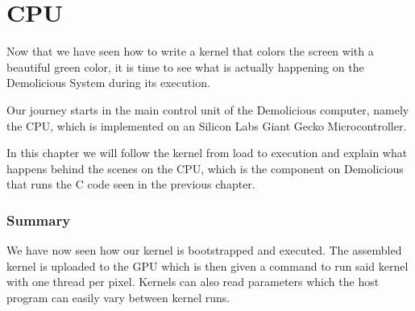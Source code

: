 \documentclass[../main/report.tex]{subfiles}
\begin{document}
\chapter{CPU}

Now that we have seen how to write a kernel that colors the screen with a beautiful green color,
it is time to see what is actually happening on the Demolicious System during its execution.

Our journey starts in the main control unit of the Demolicious computer, namely the CPU, which is implemented on an Silicon Labs Giant Gecko Microcontroller.

In this chapter we will follow the kernel from load to execution and explain what happens behind the scenes on the CPU, which is the component on Demolicious that runs the C code seen in the previous chapter.











\subsection{Summary}

We have now seen how our kernel is bootstrapped and executed.
The assembled kernel is uploaded to the GPU which is then given a command to run said kernel with one thread per pixel.
Kernels can also read parameters which the host program can easily vary between kernel runs.
\end{document}
